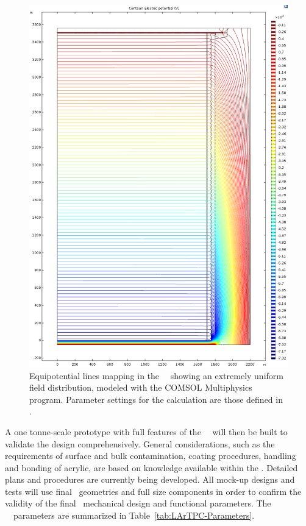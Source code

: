 \begin{figure}[!t]
\centering
\includegraphics[height=0.95\textheight]{./Figures/TPC-Field-Map.png}
\caption[Simulated electric field mapping of the \DSks\ \LArTPC]{Equipotential lines mapping in the \DSks\ \TPC\ showing an extremely uniform field distribution, modeled with the COMSOL Multiphysics program.  Parameter settings for the calculation are those defined in .}
\label{fig:TPC_Field}
\end{figure}

A one tonne-scale prototype with full features of the \DSk\ \TPC\ will then be built to validate the design comprehensively. General considerations, such as the requirements of surface and bulk contamination, coating procedures, handling and bonding of acrylic, are based on knowledge available within the \GADMC. Detailed plans and procedures are currently being developed. All mock-up designs and tests will use final \DSks\ geometries and full size components in order to confirm the validity of the final \DSks\ mechanical design and functional parameters. The \DSks\ \LArTPC\ parameters are summarized in Table~\ref{tab:LArTPC-Parameters}.


